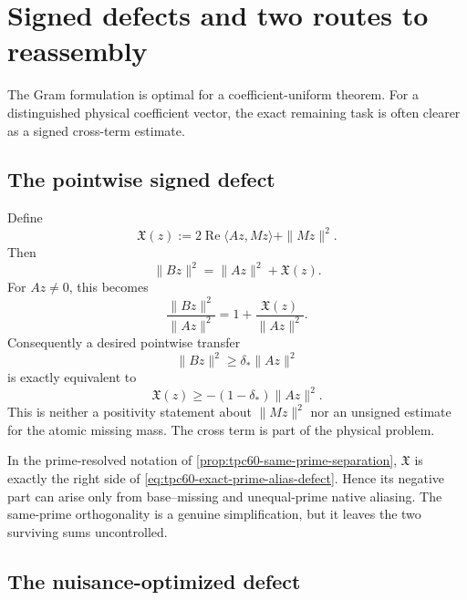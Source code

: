 \section{Signed defects and two routes to reassembly}
\label{sec:tpc60-signed-defect}

The Gram formulation is optimal for a coefficient-uniform theorem.  For a
distinguished physical coefficient vector, the exact remaining task is
often clearer as a signed cross-term estimate.

\subsection{The pointwise signed defect}

Define
\begin{equation}
 \mathfrak X(z)
 :=2\operatorname{Re}\langle Az,Mz\rangle+\|Mz\|^2.
 \label{eq:tpc60-signed-defect}
\end{equation}
Then
\begin{equation}
 \boxed{
 \|Bz\|^2=\|Az\|^2+\mathfrak X(z).}
 \label{eq:tpc60-signed-defect-identity}
\end{equation}
For \(Az\ne0\), this becomes
\begin{equation}
 \boxed{
 \frac{\|Bz\|^2}{\|Az\|^2}
 =1+\frac{\mathfrak X(z)}{\|Az\|^2}.}
 \label{eq:tpc60-signed-ratio}
\end{equation}
Consequently a desired pointwise transfer
\begin{equation}
 \|Bz\|^2\ge\delta_*\|Az\|^2
 \label{eq:tpc60-desired-pointwise-transfer}
\end{equation}
is exactly equivalent to
\begin{equation}
 \boxed{
 \mathfrak X(z)
 \ge-(1-\delta_*)\|Az\|^2.}
 \label{eq:tpc60-exact-signed-target}
\end{equation}
This is neither a positivity statement about \(\|Mz\|^2\) nor an unsigned
estimate for the atomic missing mass.  The cross term is part of the
physical problem.

In the prime-resolved notation of
\cref{prop:tpc60-same-prime-separation}, \(\mathfrak X\) is exactly the
right side of \eqref{eq:tpc60-exact-prime-alias-defect}.  Hence its negative
part can arise only from base--missing and unequal-prime native aliasing.
The same-prime orthogonality is a genuine simplification, but it leaves the
two surviving sums uncontrolled.

\subsection{The nuisance-optimized defect}

